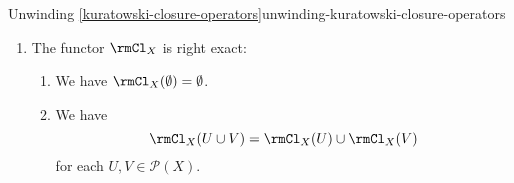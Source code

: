 \begin{remark}{Unwinding \cref{kuratowski-closure-operators}}{unwinding-kuratowski-closure-operators}
\begin{enumerate}
            \[
                \eta%
                \colon%
                \id_{\mathcal{P}(X)}%
                \Rightarrow%
                \rmCl_{X}%
            \]%
            in $\Fun(\mathcal{P}(X),\mathcal{P}(X))$, having components%
            \[
                \eta_{U}%
                \colon%
                U%
                \subset%
                \rmCl_{X}(U)%
            \]%
            with $U\in\mathcal{P}(X)$.
        \item\label{unwinding-kuratowski-closure-operators-right-exactness}The functor $\rmCl_{X}$ is right exact:
            \begin{enumerate}
                \item\label{unwinding-kuratowski-closure-operators-right-exactness-preservation-of-the-empty-set}We have $\rmCl_{X}(\emptyset)=\emptyset$.
                \item\label{unwinding-kuratowski-closure-operators-right-exactness-preservation-of-finite-unions}We have
                    \[
                        \rmCl_{X}(U\cup V)%
                        =%
                        \rmCl_{X}(U)\cup\rmCl_{X}(V)%
                    \]%
                    for each $U,V\in\mathcal{P}(X)$.
            \end{enumerate}
    \end{enumerate}
\end{remark}
